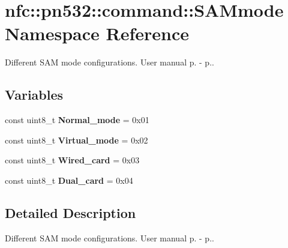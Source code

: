 \hypertarget{namespacenfc_1_1pn532_1_1command_1_1SAMmode}{}\section{nfc\+:\+:pn532\+:\+:command\+:\+:S\+A\+Mmode Namespace Reference}
\label{namespacenfc_1_1pn532_1_1command_1_1SAMmode}


Different S\+AM mode configurations. User manual p. -\/ p..  


\subsection*{Variables}
\begin{DoxyCompactItemize}
\item 
\mbox{\label{namespacenfc_1_1pn532_1_1command_1_1SAMmode_a64b69879681259b8813f3ef21cfcfcca}} 
const uint8\+\_\+t {\bfseries Normal\+\_\+mode} = 0x01
\item 
\mbox{\label{namespacenfc_1_1pn532_1_1command_1_1SAMmode_ae0506dfee39cf152a96b33c6c957cd37}} 
const uint8\+\_\+t {\bfseries Virtual\+\_\+mode} = 0x02
\item 
\mbox{\label{namespacenfc_1_1pn532_1_1command_1_1SAMmode_a29b9f6ea20c0f39095c11d8a104af787}} 
const uint8\+\_\+t {\bfseries Wired\+\_\+card} = 0x03
\item 
\mbox{\label{namespacenfc_1_1pn532_1_1command_1_1SAMmode_a6fbd926eca5ac36689a11b050b8c4acd}} 
const uint8\+\_\+t {\bfseries Dual\+\_\+card} = 0x04
\end{DoxyCompactItemize}


\subsection{Detailed Description}
Different S\+AM mode configurations. User manual p. -\/ p.. 
